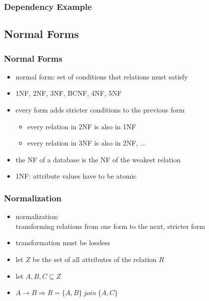 \documentclass[dvipsnames]{beamer}
\begin{document}
\begin{frame}
  \frametitle{Dependency Example}

  \begin{center}
  \end{center}
\end{frame}

\subsection{Normal Forms}

\begin{frame}
  \frametitle{Normal Forms}

  \begin{itemize}
    \item \alert{normal form}: set of conditions that relations must satisfy

    \medskip
    \item 1NF, 2NF, 3NF, BCNF, 4NF, 5NF
    \item every form adds stricter conditions to the previous form
    \begin{itemize}
      \item every relation in 2NF is also in 1NF
      \item every relation in 3NF is also in 2NF, ...
    \end{itemize}
    \item the NF of a database is the NF of the weakest relation

    \pause
    \medskip
    \item 1NF: attribute values have to be atomic
  \end{itemize}
\end{frame}

\begin{frame}
  \frametitle{Normalization}

  \begin{itemize}
    \item \alert{normalization}:\\
      transforming relations from one form to the next, stricter form

    \item transformation must be lossless
  \end{itemize}

  \pause
  \begin{theorem}[Heath]
    \begin{itemize}
      \item let $Z$ be the set of all attributes of the relation $R$
      \item let $A,B,C \subseteq Z$

      \medskip
      \item $A \rightarrow B \Rightarrow R = \{A,B\} ~join~ \{A,C\}$
    \end{itemize}
  \end{theorem}
\end{frame}
\end{document}
